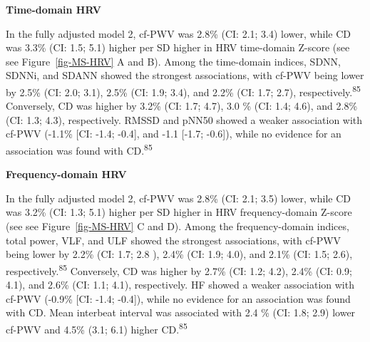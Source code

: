 \documentclass[
  a4paper,
  headsepline=true,
  open=left]{scrbook}
\begin{document}
\textbf{Time-domain HRV}

In the fully adjusted model 2, cf-PWV was 2.8\% (CI: 2.1; 3.4) lower,
while CD was 3.3\% (CI: 1.5; 5.1) higher per SD higher in HRV
time-domain Z-score (see see Figure~\ref{fig-MS-HRV} A and B). Among the
time-domain indices, SDNN, SDNNi, and SDANN showed the strongest
associations, with cf-PWV being lower by 2.5\% (CI: 2.0; 3.1), 2.5\%
(CI: 1.9; 3.4), and 2.2\% (CI: 1.7; 2.7),
respectively.\textsuperscript{85} Conversely, CD was higher by 3.2\%
(CI: 1.7; 4.7), 3.0 \% (CI: 1.4; 4.6), and 2.8\% (CI: 1.3; 4.3),
respectively. RMSSD and pNN50 showed a weaker association with cf-PWV
(-1.1\% {[}CI: -1.4; -0.4{]}, and -1.1 {[}-1.7; -0.6{]}), while no
evidence for an association was found with CD.\textsuperscript{85}

\textbf{Frequency-domain HRV}

In the fully adjusted model 2, cf-PWV was 2.8\% (CI: 2.1; 3.5) lower,
while CD was 3.2\% (CI: 1.3; 5.1) higher per SD higher in HRV
frequency-domain Z-score (see see Figure~\ref{fig-MS-HRV} C and D).
Among the frequency-domain indices, total power, VLF, and ULF showed the
strongest associations, with cf-PWV being lower by 2.2\% (CI: 1.7; 2.8
), 2.4\% (CI: 1.9; 4.0), and 2.1\% (CI: 1.5; 2.6),
respectively.\textsuperscript{85} Conversely, CD was higher by 2.7\%
(CI: 1.2; 4.2), 2.4\% (CI: 0.9; 4.1), and 2.6\% (CI: 1.1; 4.1),
respectively. HF showed a weaker association with cf-PWV (-0.9\% {[}CI:
-1.4; -0.4{]}), while no evidence for an association was found with CD.
Mean interbeat interval was associated with 2.4 \% (CI: 1.8; 2.9) lower
cf-PWV and 4.5\% (3.1; 6.1) higher CD.\textsuperscript{85}
\end{document}
